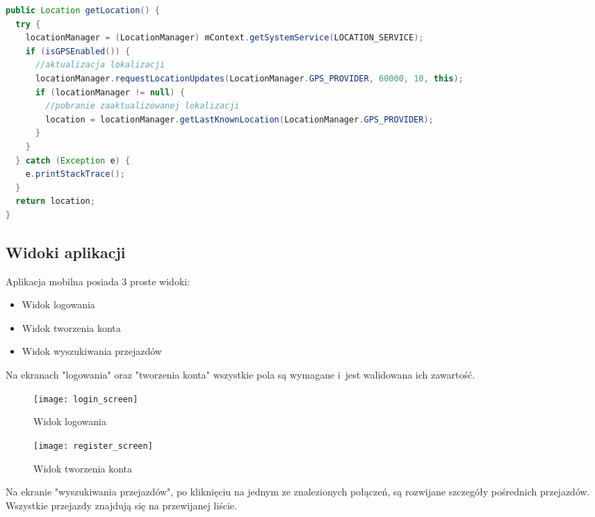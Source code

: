 \documentclass[eng,archivemode]{mgr}
\begin{document}
\begin{lstlisting}[language=java, caption={Pobranie lokalizacji}, label=lst:getLocation]
public Location getLocation() {
  try {
    locationManager = (LocationManager) mContext.getSystemService(LOCATION_SERVICE);
    if (isGPSEnabled()) {
      //aktualizacja lokalizacji
      locationManager.requestLocationUpdates(LocationManager.GPS_PROVIDER, 60000, 10, this);
      if (locationManager != null) {
        //pobranie zaaktualizowanej lokalizacji
        location = locationManager.getLastKnownLocation(LocationManager.GPS_PROVIDER);
      }
    }
  } catch (Exception e) {
    e.printStackTrace();
  }
  return location;
}
\end{lstlisting}
\newpage
\subsection{Widoki aplikacji}
Aplikacja mobilna posiada 3 proste widoki:
\begin{itemize}
	\item Widok logowania
	\item Widok tworzenia konta
	\item Widok wyszukiwania przejazdów
\end{itemize}

Na ekranach "logowania" oraz "tworzenia konta" wszystkie pola są wymagane i~jest walidowana ich zawartość.

\begin{figure}[H]
	\centering
	\begin{minipage}{0.45\textwidth}
		\centering
		\texttt{[image: login\_screen]}
		\caption{Widok logowania}
	\end{minipage}\hfill
	\begin{minipage}{0.45\textwidth}
		\centering
		\texttt{[image: register\_screen]}
		\caption{Widok tworzenia konta}
	\end{minipage}
\end{figure}

\newpage
Na ekranie "wyszukiwania przejazdów", po kliknięciu na jednym ze znalezionych połączeń, są rozwijane szczegóły pośrednich przejazdów. Wszystkie przejazdy znajdują się na przewijanej liście.
\end{document}
